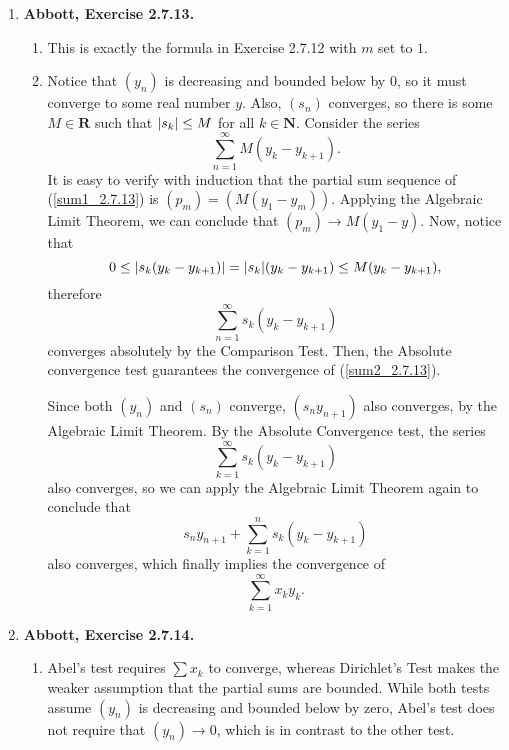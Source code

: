 \documentclass{article}
\DeclarePairedDelimiter\abs{\lvert}{\rvert}
\newcommand{\N}{\mathbf{N}}
\newcommand{\R}{\mathbf{R}}
\newcommand{\exc}[2][Abbott]{\item \textbf{#1, Exercise #2.}}
\begin{document}
\begin{enumerate}
    \exc{2.7.13}
    \begin{enumerate}
        \item This is exactly the formula in Exercise 2.7.12 with $m$ set to $1$.
        
        \item Notice that $(y_n)$ is decreasing and bounded below by $0$, so it must converge to some real number $y$. Also, $(s_n)$ converges, so there is some $M \in \R$ such that $\abs*{s_k} \leq M$ for all $k \in \N$. Consider the series
        \begin{equation}\label{sum1_2.7.13}
            \sum_{n=1}^\infty M (y_k - y_{k+1}).
        \end{equation} It is easy to verify with induction that the partial sum sequence of (\ref{sum1_2.7.13}) is $(p_m) = (M(y_1-y_m))$. Applying the Algebraic Limit Theorem, we can conclude that $(p_m) \to M(y_1-y)$. Now, notice that 
        \begin{equation*}
            0 \leq \abs*{s_k (y_k-y_{k+1})} = \abs*{s_k} (y_k-y_{k+1}) \leq 
            M (y_k-y_{k+1}),
        \end{equation*} therefore 
        \begin{equation} \label{sum2_2.7.13}
            \sum_{n=1}^\infty s_k (y_k-y_{k+1})
        \end{equation} converges absolutely by the Comparison Test. Then, the Absolute convergence test guarantees the convergence of (\ref{sum2_2.7.13}).
        
        Since both $(y_n)$ and $(s_n)$ converge, $(s_n y_{n+1})$ also converges, by the Algebraic Limit Theorem. By the Absolute Convergence test, the series 
        \begin{equation*}
            \sum_{k=1}^\infty s_k(y_k-y_{k+1})
        \end{equation*} also converges, so we can apply the Algebraic Limit Theorem again to conclude that 
        \begin{equation*}
           s_n y_{n+1} + \sum_{k=1}^n s_k(y_k-y_{k+1})
        \end{equation*} also converges, which finally implies the convergence of 
        \begin{equation*}
            \sum_{k=1}^\infty x_k y_k. 
        \end{equation*}
    \end{enumerate}
    
    \exc{2.7.14}
    \begin{enumerate}
        \item Abel's test requires $\sum x_k$ to converge, whereas Dirichlet's Test makes the weaker assumption that the partial sums are bounded. While both tests assume $(y_n)$ is decreasing and bounded below by zero, Abel's test does not require that $(y_n) \to 0$, which is in contrast to the other test.
        

\end{enumerate}
\end{enumerate}
\end{document}

